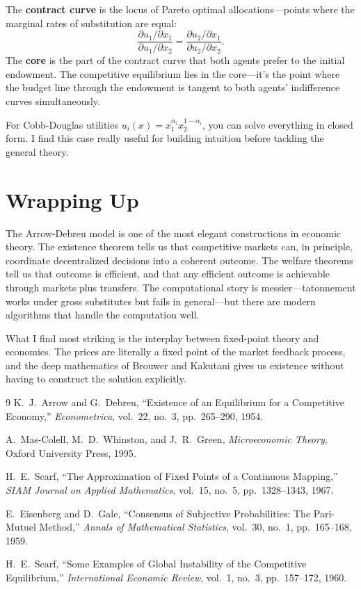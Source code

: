 \documentclass[11pt]{article}
\begin{document}
The \textbf{contract curve} is the locus of Pareto optimal allocations---points where the marginal rates of substitution are equal:
\[
\frac{\partial u_1 / \partial x_1}{\partial u_1 / \partial x_2} = \frac{\partial u_2 / \partial x_1}{\partial u_2 / \partial x_2}.
\]
The \textbf{core} is the part of the contract curve that both agents prefer to the initial endowment. The competitive equilibrium lies in the core---it's the point where the budget line through the endowment is tangent to both agents' indifference curves simultaneously.

For Cobb-Douglas utilities $u_i(x) = x_1^{\alpha_i} x_2^{1-\alpha_i}$, you can solve everything in closed form. I find this case really useful for building intuition before tackling the general theory.

\section{Wrapping Up}

The Arrow-Debreu model is one of the most elegant constructions in economic theory. The existence theorem tells us that competitive markets can, in principle, coordinate decentralized decisions into a coherent outcome. The welfare theorems tell us that outcome is efficient, and that any efficient outcome is achievable through markets plus transfers. The computational story is messier---tatonnement works under gross substitutes but fails in general---but there are modern algorithms that handle the computation well.

What I find most striking is the interplay between fixed-point theory and economics. The prices are literally a fixed point of the market feedback process, and the deep mathematics of Brouwer and Kakutani gives us existence without having to construct the solution explicitly.

\begin{thebibliography}{9}
 K.~J.~Arrow and G.~Debreu, ``Existence of an Equilibrium for a Competitive Economy,'' \emph{Econometrica}, vol.~22, no.~3, pp.~265--290, 1954.

 A.~Mas-Colell, M.~D.~Whinston, and J.~R.~Green, \emph{Microeconomic Theory}, Oxford University Press, 1995.

 H.~E.~Scarf, ``The Approximation of Fixed Points of a Continuous Mapping,'' \emph{SIAM Journal on Applied Mathematics}, vol.~15, no.~5, pp.~1328--1343, 1967.

 E.~Eisenberg and D.~Gale, ``Consensus of Subjective Probabilities: The Pari-Mutuel Method,'' \emph{Annals of Mathematical Statistics}, vol.~30, no.~1, pp.~165--168, 1959.

 H.~E.~Scarf, ``Some Examples of Global Instability of the Competitive Equilibrium,'' \emph{International Economic Review}, vol.~1, no.~3, pp.~157--172, 1960.
\end{thebibliography}
\end{document}
